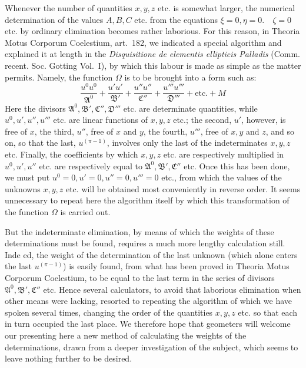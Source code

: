 Whenever the number of quantities \(x,y,z\) etc. is somewhat larger, the numerical determination of the values \(A,B,C\) etc. from the equations \(\xi=0,\allowbreak\eta=0.\quad\zeta=0\) etc. by ordinary elimination becomes rather laborious. For this reason, in Theoria Motus Corporum Coelestium, art.\ 182, we indicated a special algorithm and explained it at length in the \textit{Disquisitione de elementis ellipticis Palladis} (Comm. recent. Soc. Gotting Vol.\ I), by which this labour is made as simple as the matter permits. Namely, the function \(\Omega\) is to be brought into a form such as:
\[
\frac{u^0u^0}{\mathfrak{A}^0}+\frac{u'u'}{\mathfrak{B}'}+\frac{u''u''}{\mathfrak{C}''}+\frac{u'''u'''}{\mathfrak{D}'''}+\text{etc.}+M
\]
Here the divisors \(\mathfrak{A}^0,\mathfrak{B}',\mathfrak{C}'',\mathfrak{D}'''\) etc. are determinate quantities, while \(u^0,u',u'',u'''\) etc. are linear functions of \(x,y,z\) etc.; the second, \(u'\), however, is free of \(x\), the third, \(u''\), free of \(x\) and \(y\), the fourth, \(u'''\), free of \(x,y\) and \(z\), and so on, so that the last, \(u^{(\pi-1)}\), involves only the last of the indeterminates \(x,y,z\) etc. Finally, the coefficients by which \(x,y,z\) etc. are respectively multiplied in \(u^0,u',u''\) etc. are respectively equal to \(\mathfrak{A}^0,\mathfrak{B}',\mathfrak{C}''\) etc. Once this has been done, we must put \(u^0=0,\allowbreak u'=0,\allowbreak u''=0,\allowbreak u'''=0\) etc., from which the values of the unknowns \(x,y,z\) etc. will be obtained most conveniently in reverse order. It seems unnecessary to repeat here the algorithm itself by which this transformation of the function \(\Omega\) is carried out.

But the indeterminate elimination, by means of which the weights of these determinations must be found, requires a much more lengthy calculation still. Inde%
ed, the weight of the determination of the last unknown (which alone enters the last \(u^{(\pi-1)}\)) is easily found, from what has been proved in Theoria Motus Corporum Coelestium, to be equal to the last term in the series of divisors \(\mathfrak{A}^0,\mathfrak{B}',\mathfrak{C}''\) etc. Hence several calculators, to avoid that laborious elimination when other means were lacking, resorted to repeating the algorithm of which we have spoken several times, changing the order of the quantities \(x,y,z\) etc. so that each in turn occupied the last place. We therefore hope that geometers will welcome our presenting here a new method of calculating the weights of the determinations, drawn from a deeper investigation of the subject, which seems to leave nothing further to be desired.

